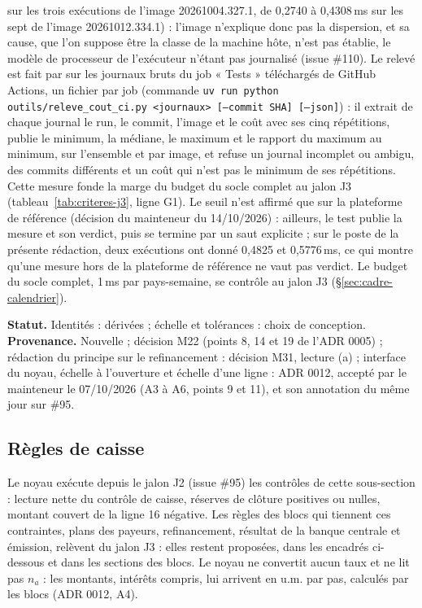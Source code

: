 \documentclass[11pt,a4paper]{article}
\newcommand{\code}[1]{\texttt{\detokenize{#1}}}
\begin{document}
sur les trois exécutions de l'image 20261004.327.1, de 0,2740 à 0,4308\,ms sur les sept de l'image 20261012.334.1) : l'image n'explique donc pas la dispersion, et sa cause, que l'on suppose être la classe de la machine hôte, n'est pas établie, le modèle de processeur de l'exécuteur n'étant pas journalisé (issue \#110). Le relevé est fait par \code{outils/releve_cout_ci.py} sur les journaux bruts du job « Tests » téléchargés de GitHub Actions, un fichier par job (commande \texttt{uv run python outils/releve\_cout\_ci.py <journaux> [--commit SHA] [--json]}) : il extrait de chaque journal le run, le commit, l'image et le coût avec ses cinq répétitions, publie le minimum, la médiane, le maximum et le rapport du maximum au minimum, sur l'ensemble et par image, et refuse un journal incomplet ou ambigu, des commits différents et un coût qui n'est pas le minimum de ses répétitions. Cette mesure fonde la marge du budget du socle complet au jalon J3 (tableau~\ref{tab:criteres-j3}, ligne G1). Le seuil n'est affirmé que sur la plateforme de référence (décision du mainteneur du 14/10/2026) : ailleurs, le test publie la mesure et son verdict, puis se termine par un saut explicite ; sur le poste de la présente rédaction, deux exécutions ont donné 0,4825 et 0,5776\,ms, ce qui montre qu'une mesure hors de la plateforme de référence ne vaut pas verdict. Le budget du socle complet, 1\,ms par pays-semaine, se contrôle au jalon J3 (\S\ref{sec:cadre-calendrier}).

\textbf{Statut.} Identités : dérivées ; échelle et tolérances : choix de conception. \textbf{Provenance.} Nouvelle ; décision M22 (points 8, 14 et 19 de l'ADR 0005) ; rédaction du principe sur le refinancement : décision M31, lecture (a) ; interface du noyau, échelle à l'ouverture et échelle d'une ligne : ADR 0012, accepté par le mainteneur le 07/10/2026 (A3 à A6, points 9 et 11), et son annotation du même jour sur \#95.

\subsection{Règles de caisse}
\label{sec:cadre-caisse}
Le noyau exécute depuis le jalon J2 (issue \#95) les contrôles de cette sous-section : lecture nette du contrôle de caisse, réserves de clôture positives ou nulles, montant couvert de la ligne 16 négative. Les règles des blocs qui tiennent ces contraintes, plans des payeurs, refinancement, résultat de la banque centrale et émission, relèvent du jalon J3 : elles restent proposées, dans les encadrés ci-dessous et dans les sections des blocs. Le noyau ne convertit aucun taux et ne lit pas $n_a$ : les montants, intérêts compris, lui arrivent en u.m. par pas, calculés par les blocs (ADR 0012, A4).
\end{document}
